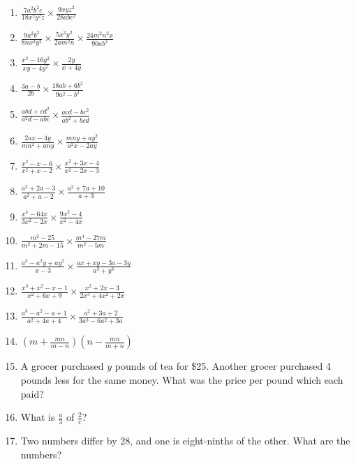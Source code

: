 \documentclass{book}
\begin{document}
\begin{enumerate}

\item $\displaystyle \frac{7a^2b^2c}{18x^2y^2z} \times
\frac{9xyz^2}{28abc^2}$

\item $\displaystyle \frac{9a^2b^2}{8nx^3y^2} \times
\frac{5x^2y^2}{2am^2n} \times \frac{24m^2n^2x}{90ab^2}$

\item $\displaystyle \frac{x^2 - 16y^2}{xy - 4y^2} \times
\frac{2y}{x + 4y}$

\item$\displaystyle \frac{3a - b}{2b} \times \frac{18ab +
6b^2}{9a^2 - b^2}$

\item$\displaystyle \frac{abd + cd^2}{a^2d - abc} \times \frac{acd
- bc^2}{ab^2 + bcd}$

\item$\displaystyle \frac{2ax - 4y}{mn^2 + any} \times \frac{mny +
ay^2}{a^2x - 2ay}$

\item$\displaystyle \frac{x^2 - x - 6}{x^2 + x - 2} \times
\frac{x^2 + 3x - 4}{x^2 - 2x - 3}$

\item$\displaystyle \frac{a^2 + 2a - 3}{a^2 + a - 2} \times
\frac{a^2 + 7a + 10}{a + 3}$

\item$\displaystyle \frac{x^4 - 64x}{3x^2 - 2x} \times \frac{9x^2
- 4}{x^2 - 4x}$

\item$\displaystyle \frac{m^2 - 25}{m^2 + 2m - 15} \times
\frac{m^4 - 27m}{m^2 - 5m}$

\item$\displaystyle \frac{a^3 - a^2y + ay^2}{x - 3} \times
\frac{ax + xy - 3a -3y}{a^3 + y^3}$

\item$\displaystyle \frac{x^3 + x^2 - x - 1}{x^2 + 6x + 9} \times
\frac{x^2 + 2x - 3}{2x^3 + 4x^2 + 2x}$

\item$\displaystyle \frac{a^3 - a^2 - a + 1}{a^2 + 4a + 4} \times
\frac{a^2 + 3a + 2}{3a^3 - 6a^2 + 3a}$

\item$\displaystyle (m + \frac{mn}{m - n})(n - \frac{mn}{m + n})$

\item A grocer purchased $y$ pounds of tea for \$25. Another
grocer purchased 4 pounds less for the same money. What was the
price per pound which each paid?

\item What is $\displaystyle \frac{a}{3}$ of $\displaystyle
\frac{2}{c}$?

\item Two numbers differ by 28, and one is eight-ninths of the
other. What are the numbers?
\end{enumerate}
\end{document}
